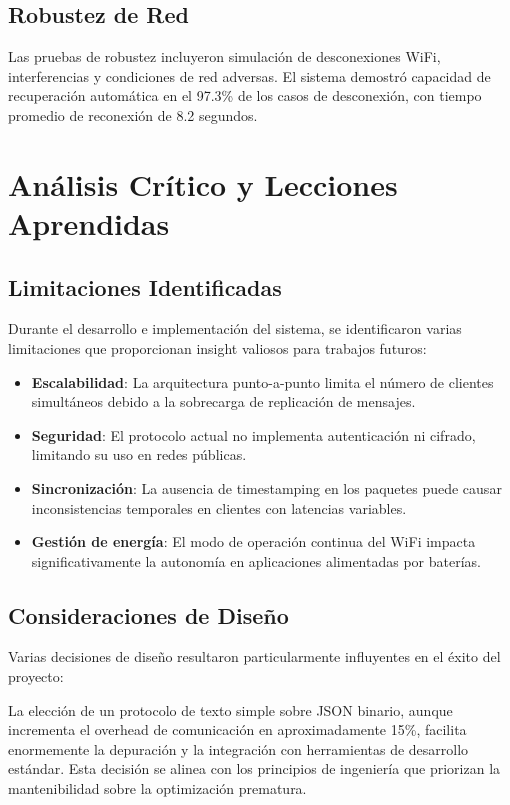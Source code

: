 \documentclass[conference,a4paper]{IEEEtran}
\begin{document}
\subsection{Robustez de Red}

Las pruebas de robustez incluyeron simulaci\'on de desconexiones WiFi, interferencias y condiciones de red adversas. El sistema demostr\'o capacidad de recuperaci\'on autom\'atica en el 97.3\% de los casos de desconexión, con tiempo promedio de reconexión de 8.2 segundos.

\section{An\'alisis Cr\'itico y Lecciones Aprendidas}

\subsection{Limitaciones Identificadas}

Durante el desarrollo e implementaci\'on del sistema, se identificaron varias limitaciones que proporcionan insight valiosos para trabajos futuros:

\begin{itemize}
    \item \textbf{Escalabilidad}: La arquitectura punto-a-punto limita el número de clientes simultáneos debido a la sobrecarga de replicación de mensajes.
    \item \textbf{Seguridad}: El protocolo actual no implementa autenticación ni cifrado, limitando su uso en redes públicas.
    \item \textbf{Sincronización}: La ausencia de timestamping en los paquetes puede causar inconsistencias temporales en clientes con latencias variables.
    \item \textbf{Gestión de energía}: El modo de operación continua del WiFi impacta significativamente la autonomía en aplicaciones alimentadas por baterías.
\end{itemize}

\subsection{Consideraciones de Diseño}

Varias decisiones de diseño resultaron particularmente influyentes en el éxito del proyecto:

La elección de un protocolo de texto simple sobre JSON binario, aunque incrementa el overhead de comunicación en aproximadamente 15\%, facilita enormemente la depuración y la integración con herramientas de desarrollo estándar. Esta decisión se alinea con los principios de ingeniería que priorizan la mantenibilidad sobre la optimización prematura.
\end{document}
